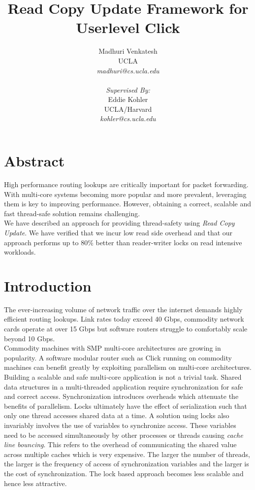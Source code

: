\documentclass[12pt,a4paper]{article}
\begin{document}
\author { 
Madhuri Venkatesh 
\\ UCLA 
\\ \textsl{madhuri@cs.ucla.edu}
\\
\\
\textsl{Supervised By:}
\\Eddie Kohler 
\\ UCLA/Harvard
\\ \textsl{kohler@cs.ucla.edu}
}
\title{Read Copy Update Framework for Userlevel Click}
\maketitle

\pagebreak
\section{Abstract}
High performance routing lookups are critically important for packet forwarding. With multi-core systems becoming more popular and more prevalent, leveraging them is key to improving performance. However, obtaining a correct, scalable and fast thread-safe solution remains challenging.\\

We have described an approach for providing thread-safety using \emph{Read Copy Update}. We have verified that we incur low read side overhead and that our approach performs up to 80\% better than reader-writer locks on read intensive workloads.
\section{Introduction}
The ever-increasing volume of network traffic over the internet demands highly efficient routing lookups. Link rates today exceed 40 Gbps, commodity network cards operate at over 15 Gbps but software routers struggle to comfortably scale beyond 10 Gbps.\\

Commodity machines with SMP multi-core architectures are growing in popularity. A software modular router such as Click\cite{click} running on commodity machines  can benefit greatly by exploiting parallelism on multi-core architectures.\\

Building a scalable and safe multi-core application is not a trivial task. Shared data structures in a multi-threaded application require synchronization for safe and correct access. Synchronization introduces overheads which attenuate the benefits of parallelism. Locks ultimately have the effect of  serialization such that only one thread accesses shared data at a time. A solution using locks also invariably involves the use of variables to synchronize access. These variables need to be accessed simultaneously by other processes or threads causing \emph{cache line bouncing}. This refers to the overhead of communicating the shared value across multiple caches which is very expensive. The larger the number of threads, the larger is the frequency of access of synchronization variables and the larger is the cost of synchronization. The lock based approach becomes less scalable and hence less attractive.\\
\end{document}
